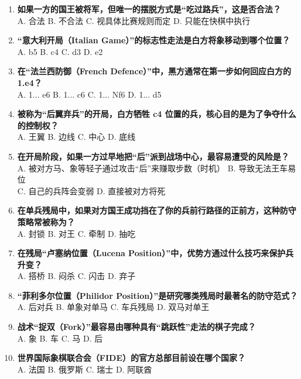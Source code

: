 \documentclass[a4paper, 11pt]{ctexart}
\begin{document}
\begin{enumerate}[label=\arabic*., itemsep=1.5em]
    \item \textbf{如果一方的国王被将军，但唯一的摆脱方式是“吃过路兵”，这是否合法？} \\
    A. 合法 \qquad B. 不合法 \qquad C. 视具体比赛规则而定 \qquad D. 只能在快棋中执行

    \item \textbf{“意大利开局（Italian Game）”的标志性走法是白方将象移动到哪个位置？} \\
    A. b5 \qquad B. c4 \qquad C. d3 \qquad D. e2

    \item \textbf{在“法兰西防御（French Defence）”中，黑方通常在第一步如何回应白方的 1.e4？} \\
    A. 1... e6 \qquad B. 1... c6 \qquad C. 1... Nf6 \qquad D. 1... d5

    \item \textbf{被称为“后翼弃兵”的开局，白方牺牲 c4 位置的兵，核心目的是为了争夺什么的控制权？} \\
    A. 王翼 \qquad B. 边线 \qquad C. 中心 \qquad D. 底线

    \item \textbf{在开局阶段，如果一方过早地把“后”派到战场中心，最容易遭受的风险是？} \\
    A. 被对方马、象等轻子通过攻击“后”来赚取步数（时机） \qquad B. 导致无法王车易位 \\
    C. 自己的兵阵会变弱 \qquad D. 直接被对方将死

    \item \textbf{在单兵残局中，如果对方国王成功挡在了你的兵前行路径的正前方，这种防守策略常被称为？} \\
    A. 封锁 \qquad B. 对王 \qquad C. 牵制 \qquad D. 抽吃

    \item \textbf{在残局“卢塞纳位置（Lucena Position）”中，优势方通过什么技巧来保护兵升变？} \\
    A. 搭桥 \qquad B. 闷杀 \qquad C. 闪击 \qquad D. 弃子

    \item \textbf{“菲利多尔位置（Philidor Position）”是研究哪类残局时最著名的防守范式？} \\
    A. 后对兵 \qquad B. 单象对单马 \qquad C. 车兵残局 \qquad D. 双马对单王

    \item \textbf{战术“捉双（Fork）”最容易由哪种具有“跳跃性”走法的棋子完成？} \\
    A. 象 \qquad B. 车 \qquad C. 马 \qquad D. 后

    \item \textbf{世界国际象棋联合会（FIDE）的官方总部目前设在哪个国家？} \\
    A. 法国 \qquad B. 俄罗斯 \qquad C. 瑞士 \qquad D. 阿联酋


\end{enumerate}
\end{document}
